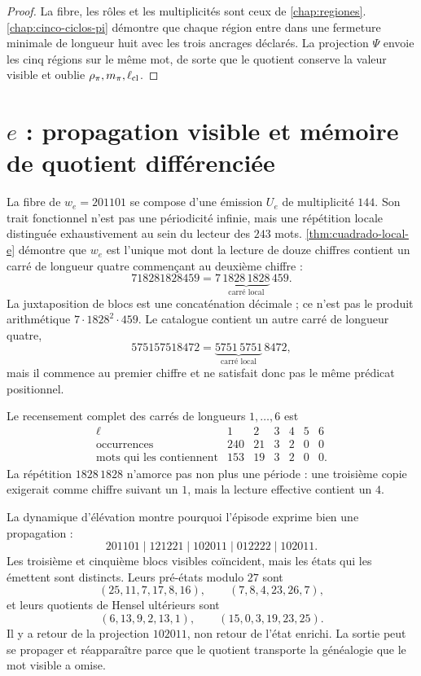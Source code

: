 \begin{proof}
La fibre, les rôles et les multiplicités sont ceux de
\cref{chap:regiones}. \cref{chap:cinco-ciclos-pi} démontre que chaque
région entre dans une fermeture minimale de longueur huit avec les trois ancrages
déclarés. La projection \(\Psi\) envoie les cinq régions sur le même
mot, de sorte que le quotient conserve la valeur visible et oublie
\(\rho_\pi,m_\pi,\ell_{\rm cl}\).
\end{proof}

\section{\texorpdfstring{\(e\)}{e} : propagation visible et mémoire de quotient différenciée}

La fibre de \(w_e=201101\) se compose d'une émission \(U_e\) de multiplicité
\(144\). Son trait fonctionnel n'est pas une périodicité infinie, mais une
répétition locale distinguée exhaustivement au sein du lecteur des
\(243\) mots. \cref{thm:cuadrado-local-e} démontre que \(w_e\) est
l'unique mot dont la lecture de douze chiffres contient un carré de longueur
quatre commençant au deuxième chiffre :
\[
718281828459
=7\,\underbrace{1828\,1828}_{\text{carré local}}\,459.
\]
La juxtaposition de blocs est une concaténation décimale ; ce n'est pas le produit
arithmétique \(7\cdot1828^2\cdot459\). Le catalogue contient un autre carré de
longueur quatre,
\[
575157518472
=\underbrace{5751\,5751}_{\text{carré local}}\,8472,
\]
mais il commence au premier chiffre et ne satisfait donc pas le même
prédicat positionnel.

Le recensement complet des carrés de longueurs \(1,\ldots,6\) est
\[
\begin{array}{crrrrrr}
\ell&1&2&3&4&5&6\\
\text{occurrences}&240&21&3&2&0&0\\
\text{mots qui les contiennent}&153&19&3&2&0&0.
\end{array}
\]
La répétition \(1828\,1828\) n'amorce pas non plus une période : une troisième copie
exigerait comme chiffre suivant un \(1\), mais la lecture effective contient
un \(4\).

La dynamique d'élévation montre pourquoi l'épisode exprime bien une
propagation :
\[
201101\mid121221\mid102011\mid012222\mid102011.
\]
Les troisième et cinquième blocs visibles coïncident, mais les états qui les
émettent sont distincts. Leurs pré-états modulo \(27\) sont
\[
(25,11,7,17,8,16),
\qquad
(7,8,4,23,26,7),
\]
et leurs quotients de Hensel ultérieurs sont
\[
(6,13,9,2,13,1),
\qquad
(15,0,3,19,23,25).
\]
Il y a retour de la projection \(102011\), non retour de l'état enrichi.
La sortie peut se propager et réapparaître parce que le quotient transporte la
généalogie que le mot visible a omise.

